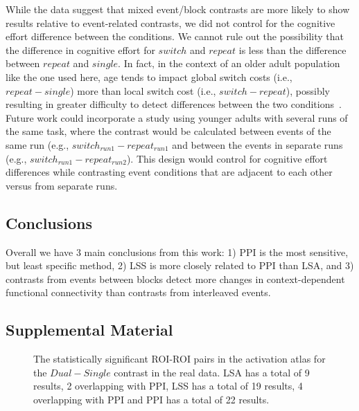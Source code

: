 \documentclass[phd,appendix,figures]{uithesis}
\begin{document}
While the data suggest that mixed event/block contrasts are more likely to show results relative to event-related contrasts,
we did not control for the cognitive effort difference between the conditions.
We cannot rule out the possibility that the difference in cognitive effort for
$switch$ and $repeat$ is less than the difference between $repeat$ and $single$.
In fact, in the context of an older adult population like the one used here,
age tends to impact global switch costs (i.e., $repeat - single$) more than local
switch cost (i.e., $switch - repeat$), possibly resulting in greater difficulty to detect
differences between the two conditions~\cite{Wasylyshyn2011}.
Future work could incorporate a study using younger adults with several runs of the same task, where
the contrast would be calculated between events of the same run (e.g., $switch_{run1} - repeat_{run1}$
and between the events in separate runs (e.g., $switch_{run1} - repeat_{run2}$).
This design would control for cognitive effort differences while contrasting event conditions that are adjacent
to each other versus from separate runs.

\subsection{Conclusions}
Overall we have 3 main conclusions from this work:
1) PPI is the most sensitive, but least specific method,
2) LSS is more closely related to PPI than LSA, and
3) contrasts from events between blocks detect more changes
in context-dependent functional connectivity than contrasts
from interleaved events.

\subsection{Supplemental Material}

\begin{figure}[H]
  \centering


  \caption[All contrasts for all atlases for all data for LSA/LSS versus PPI]{
      The statistically significant ROI-ROI pairs in the activation atlas
      for the $Dual - Single$ contrast in the real data.
      LSA has a total of 9 results, 2 overlapping with PPI,
      LSS has a total of 19 results, 4 overlapping with PPI and
      PPI has a total of 22 results.
  }
  \label{fig:data-real_type-brain_atlas-activation_contrast-dualxsingle}
\end{figure}
\end{document}

